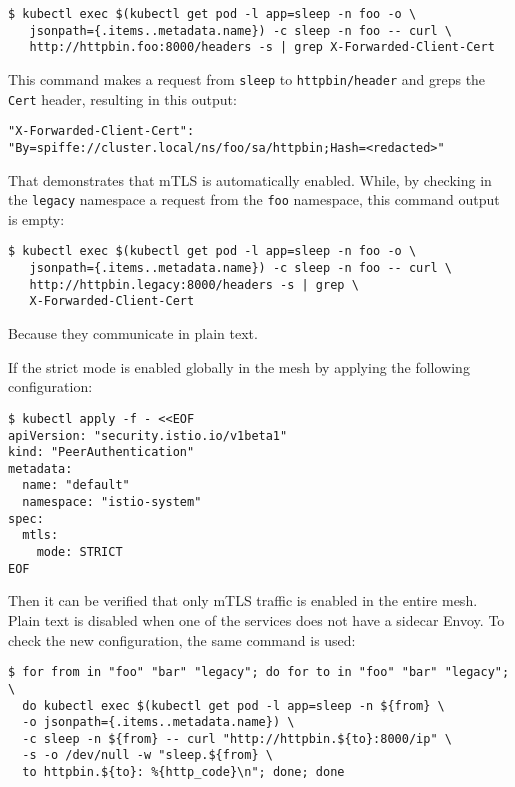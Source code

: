 \begin{lstlisting}
$ kubectl exec $(kubectl get pod -l app=sleep -n foo -o \
   jsonpath={.items..metadata.name}) -c sleep -n foo -- curl \
   http://httpbin.foo:8000/headers -s | grep X-Forwarded-Client-Cert

\end{lstlisting}

\noindent This command makes a request from \texttt{sleep} to \texttt{httpbin/header} and greps the \texttt{Cert} header, resulting in this output:

\begin{lstlisting}[basicstyle = \fontsize{9}{10}\selectfont]
"X-Forwarded-Client-Cert": "By=spiffe://cluster.local/ns/foo/sa/httpbin;Hash=<redacted>"
\end{lstlisting}

\noindent That demonstrates that mTLS is automatically enabled. While, by checking in the \texttt{legacy} namespace a request from the \texttt{foo} namespace, this command output is empty:
\newpage
\begin{lstlisting}
$ kubectl exec $(kubectl get pod -l app=sleep -n foo -o \
   jsonpath={.items..metadata.name}) -c sleep -n foo -- curl \ 
   http://httpbin.legacy:8000/headers -s | grep \
   X-Forwarded-Client-Cert
\end{lstlisting}

\noindent Because they communicate in plain text.

If the strict mode is enabled globally in the mesh by applying the following configuration:

\begin{lstlisting}
$ kubectl apply -f - <<EOF
apiVersion: "security.istio.io/v1beta1"
kind: "PeerAuthentication"
metadata:
  name: "default"
  namespace: "istio-system"
spec:
  mtls:
    mode: STRICT
EOF
\end{lstlisting}

\noindent Then it can be verified that only mTLS traffic is enabled in the entire mesh. Plain text is disabled when one of the services does not have a sidecar Envoy. To check the new configuration, the same command is used:

\begin{lstlisting}
$ for from in "foo" "bar" "legacy"; do for to in "foo" "bar" "legacy";  \
  do kubectl exec $(kubectl get pod -l app=sleep -n ${from} \
  -o jsonpath={.items..metadata.name}) \
  -c sleep -n ${from} -- curl "http://httpbin.${to}:8000/ip" \ 
  -s -o /dev/null -w "sleep.${from} \
  to httpbin.${to}: %{http_code}\n"; done; done
\end{lstlisting}

